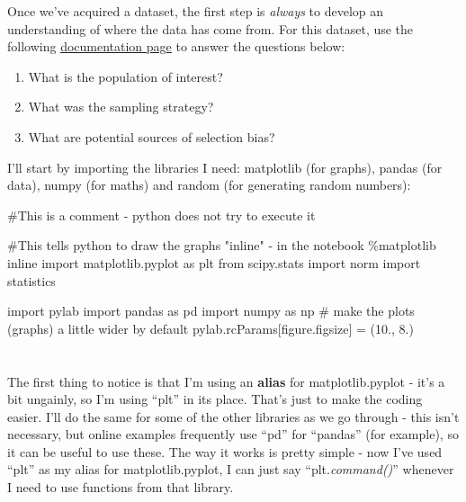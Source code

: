 \documentclass[
  letterpaper,
  DIV=11,
  numbers=noendperiod]{scrreprt}
\newenvironment{Shaded}{\begin{snugshade}}{\end{snugshade}}
\newcommand{\CommentTok}[1]{\textcolor[rgb]{0.37,0.37,0.37}{#1}}
\newcommand{\FloatTok}[1]{\textcolor[rgb]{0.68,0.00,0.00}{#1}}
\newcommand{\ImportTok}[1]{\textcolor[rgb]{0.00,0.46,0.62}{#1}}
\newcommand{\NormalTok}[1]{\textcolor[rgb]{0.00,0.23,0.31}{#1}}
\newcommand{\OperatorTok}[1]{\textcolor[rgb]{0.37,0.37,0.37}{#1}}
\newcommand{\StringTok}[1]{\textcolor[rgb]{0.13,0.47,0.30}{#1}}
\providecommand{\tightlist}{%
  \setlength{\itemsep}{0pt}\setlength{\parskip}{0pt}}\usepackage{longtable,booktabs,array}
\begin{document}
Once we've acquired a dataset, the first step is \emph{always} to
develop an understanding of where the data has come from. For this
dataset, use the following
\href{https://www.census.gov/programs-surveys/cps/technical-documentation/methodology.html}{documentation
page} to answer the questions below:

\begin{enumerate}
\def\labelenumi{\arabic{enumi})}
\tightlist
\item
  What is the population of interest?
\item
  What was the sampling strategy?
\item
  What are potential sources of selection bias?
\end{enumerate}

I'll start by importing the libraries I need: matplotlib (for graphs),
pandas (for data), numpy (for maths) and random (for generating random
numbers):

\begin{Shaded}
\begin{Highlighting}[]
\CommentTok{\#This is a comment {-} python does not try to execute it}

\CommentTok{\#This tells python to draw the graphs "inline" {-} in the notebook}
\OperatorTok{\%}\NormalTok{matplotlib inline  }
\ImportTok{import}\NormalTok{ matplotlib.pyplot }\ImportTok{as}\NormalTok{ plt}
\ImportTok{from}\NormalTok{ scipy.stats }\ImportTok{import}\NormalTok{ norm}
\ImportTok{import}\NormalTok{ statistics}

\ImportTok{import}\NormalTok{ pylab}
\ImportTok{import}\NormalTok{ pandas }\ImportTok{as}\NormalTok{ pd}
\ImportTok{import}\NormalTok{ numpy }\ImportTok{as}\NormalTok{ np}
\CommentTok{\# make the plots (graphs) a little wider by default}
\NormalTok{pylab.rcParams[}\StringTok{\textquotesingle{}figure.figsize\textquotesingle{}}\NormalTok{] }\OperatorTok{=}\NormalTok{ (}\FloatTok{10.}\NormalTok{, }\FloatTok{8.}\NormalTok{)}
\end{Highlighting}
\end{Shaded}

\hypertarget{section}{%
\section{}\label{section}}

The first thing to notice is that I'm using an \textbf{alias} for
matplotlib.pyplot - it's a bit ungainly, so I'm using ``plt'' in its
place. That's just to make the coding easier. I'll do the same for some
of the other libraries as we go through - this isn't necessary, but
online examples frequently use ``pd'' for ``pandas'' (for example), so
it can be useful to use these. The way it works is pretty simple - now
I've used ``plt'' as my alias for matplotlib.pyplot, I can just say
``plt.\emph{command()}'' whenever I need to use functions from that
library.
\end{document}
